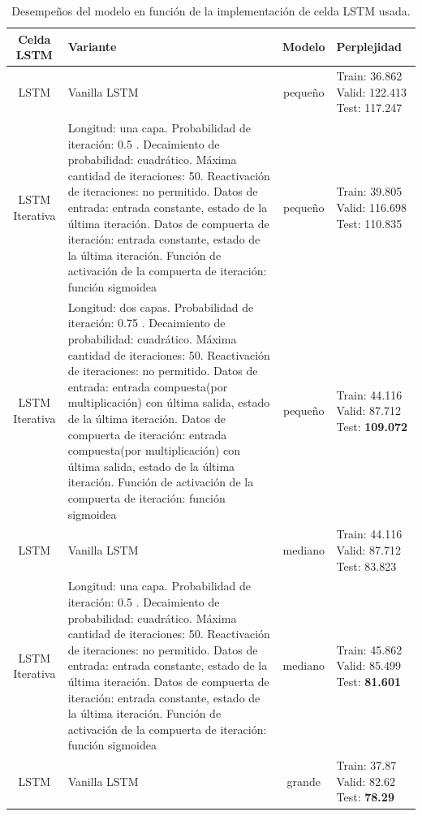 \documentclass{article}
\begin{document}
\begin{table}[h]
\centering
\begin{tabular}{| c | p{6cm} | c | p{1.5cm} |}
\hline
Celda LSTM & Variante & Modelo & Perplejidad\\
\hline
\hline
LSTM & Vanilla LSTM & pequeño & Train: 36.862 Valid: 122.413 Test: 117.247\\

\hline
LSTM Iterativa & Longitud: una capa. Probabilidad de iteración: 0.5 . Decaimiento de probabilidad: cuadrático. Máxima cantidad de iteraciones: 50. Reactivación de iteraciones: no permitido. Datos de entrada: entrada constante, estado de la última iteración. Datos de compuerta de iteración: entrada constante, estado de la última iteración. Función de activación de la compuerta de iteración: función sigmoidea & pequeño & Train: 39.805 Valid: 116.698 Test: 110.835\\
				
\hline
LSTM Iterativa & Longitud: dos capas. Probabilidad de iteración: 0.75 . Decaimiento de probabilidad: cuadrático. Máxima cantidad de iteraciones: 50. Reactivación de iteraciones: no permitido. Datos de entrada: entrada compuesta(por multiplicación) con última salida, estado de la última iteración. Datos de compuerta de iteración: entrada compuesta(por multiplicación) con última salida, estado de la última iteración. Función de activación de la compuerta de iteración: función sigmoidea & pequeño & Train: 44.116 Valid: 87.712 Test: \textbf{109.072}\\
\hline
\hline
LSTM & Vanilla LSTM & mediano & Train: 44.116 Valid: 87.712 Test: 83.823\\

\hline
LSTM Iterativa & Longitud: una capa. Probabilidad de iteración: 0.5 . Decaimiento de probabilidad: cuadrático. Máxima cantidad de iteraciones: 50. Reactivación de iteraciones: no permitido. Datos de entrada: entrada constante, estado de la última iteración. Datos de compuerta de iteración: entrada constante, estado de la última iteración. Función de activación de la compuerta de iteración: función sigmoidea & mediano & Train: 45.862 Valid: 85.499 Test: \textbf{81.601}\\
\hline
\hline
LSTM & Vanilla LSTM & grande & Train: 37.87 Valid: 82.62 Test: \textbf{78.29}\\
\hline
\end{tabular}
\label{tablaDesempenios}
\caption{Desempeños del modelo en función de la implementación de celda LSTM usada.}
\end{table}
\end{document}
